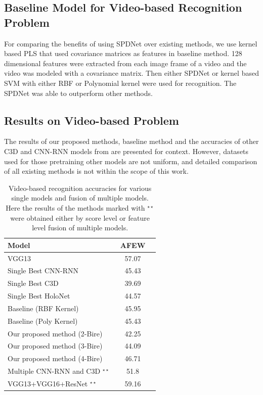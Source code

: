 \documentclass[10pt,twocolumn,letterpaper]{article}
\begin{document}
		\subsection{Baseline Model for Video-based Recognition Problem}
		For comparing the benefits of using SPDNet over existing methods, we use kernel based PLS that used covariance matrices as features \cite{emoti14} in baseline method. 128 dimensional features were extracted from each image frame of a video and the video was modeled with a covariance matrix. Then either SPDNet or kernel based SVM with either RBF or Polynomial kernel were used for recognition. The SPDNet was able to outperform other methods.
		
		\subsection{Results on Video-based Problem}
		The results of our proposed methods, baseline method and the accuracies of other C3D and CNN-RNN models from \cite{emoti161} are presented for context. However, datasets used for those pretraining other models are not uniform, and detailed comparison of all existing methods is not within the scope of this work.
		\begin{table}[ht]
			\centering
			\begin{tabular}{lcc}
				\toprule
				Model 					& AFEW\\
				\midrule
				VGG13~\cite{emoti167}					& 57.07\\
				Single Best CNN-RNN~\cite{emoti161}		& 45.43	\\
				Single Best C3D~\cite{emoti161}			& 39.69	\\
				Single Best HoloNet~\cite{emoti1632}	& 44.57	\\
				Baseline (RBF Kernel)~\cite{emoti14}	& 45.95	\\
				Baseline (Poly Kernel)~\cite{emoti14}	& 45.43	\\
				Our proposed method (2-Bire)		    & 42.25 \\
				Our proposed method (3-Bire)		    & 44.09 \\
				Our proposed method (4-Bire)		    & 46.71 \\
				
				\midrule
				\midrule	
				Multiple CNN-RNN and C3D $^{\star\star}$~\cite{emoti161}& 51.8 \\
				VGG13+VGG16+ResNet $^{\star\star}$~\cite{emoti1632}	& 59.16 \\	
				\bottomrule
			\end{tabular}
			\caption{Video-based recognition accuracies for various single models and fusion of multiple models. Here the results of the methods marked with $^{\star\star}$ were obtained either by score level or feature level fusion of multiple models.}
			\label{table:2step}
		\end{table}
\end{document}
